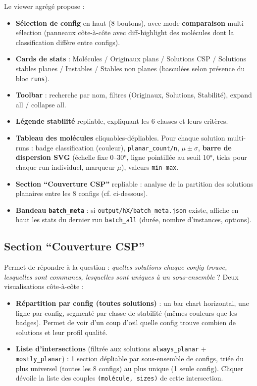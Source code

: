 \documentclass[12pt,a4paper]{article}
\theoremstyle{definition}
\begin{document}
Le viewer agrégé propose :
\begin{itemize}
  \item \textbf{Sélection de config} en haut (8 boutons), avec mode \textbf{comparaison}
    multi-sélection (panneaux côte-à-côte avec diff-highlight des molécules dont la
    classification diffère entre configs).
  \item \textbf{Cards de stats} : Molécules / Originaux plans / Solutions CSP / Solutions
    stables planes / Instables / Stables non planes (basculées selon présence du bloc
    \texttt{runs}).
  \item \textbf{Toolbar} : recherche par nom, filtres (Originaux, Solutions, Stabilité),
    expand all / collapse all.
  \item \textbf{Légende stabilité} repliable, expliquant les 6 classes et leurs critères.
  \item \textbf{Tableau des molécules} cliquables-dépliables. Pour chaque solution
    multi-runs : badge classification (couleur), \texttt{planar\_count/n}, $\mu \pm \sigma$,
    \textbf{barre de dispersion SVG} (échelle fixe 0--30°, ligne pointillée au seuil 10°,
    ticks pour chaque run individuel, marqueur $\mu$), valeurs \texttt{min--max}.
  \item \textbf{Section ``Couverture CSP''} repliable : analyse de la partition des solutions
    planaires entre les 8 configs (cf. ci-dessous).
  \item \textbf{Bandeau \texttt{batch\_meta}} : si \texttt{output/hX/batch\_meta.json}
    existe, affiche en haut les stats du dernier run \texttt{batch\_all} (durée, nombre
    d'instances, options).
\end{itemize}

\subsection{Section ``Couverture CSP''}

Permet de répondre à la question : \emph{quelles solutions chaque config trouve, lesquelles
sont communes, lesquelles sont uniques à un sous-ensemble} ? Deux visualisations côte-à-côte :

\begin{itemize}
  \item \textbf{Répartition par config (toutes solutions)} : un bar chart horizontal, une
    ligne par config, segmenté par classe de stabilité (mêmes couleurs que les badges).
    Permet de voir d'un coup d'\oe{}il quelle config trouve combien de solutions et leur
    profil qualité.
  \item \textbf{Liste d'intersections} (filtrée aux solutions \texttt{always\_planar} +
    \texttt{mostly\_planar}) : 1 section dépliable par sous-ensemble de configs, triée du
    plus universel (toutes les 8 configs) au plus unique (1 seule config). Cliquer dévoile
    la liste des couples \texttt{(molécule, sizes)} de cette intersection.
\end{itemize}
\end{document}
